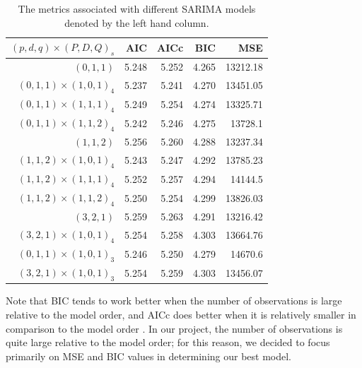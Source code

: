 \documentclass[11pt]{paper}
\begin{document}
\begin{table}
\centering
\begin{tabular}{r || r | r| r| r}
$(p, d, q) \times(P, D, Q)_s$   & AIC   &AICc   &BIC    &MSE\\
\hline
$(0, 1, 1)$               & 5.248 &5.252  &4.265  &13212.18\\
$(0, 1, 1) \times (1, 0, 1)_4$   & 5.237 &5.241  &4.270  &13451.05\\ %
$(0, 1, 1) \times (1, 1, 1)_4$   & 5.249 &5.254  &4.274  &13325.71\\
$(0, 1, 1) \times (1, 1, 2)_4$   & 5.242 &5.246  &4.275  &13728.1\\
\hline
$(1, 1, 2)$               & 5.256 & 5.260 &4.288  &13237.34\\
$(1, 1, 2) \times (1, 0, 1)_4$   & 5.243 &5.247  &4.292  &13785.23\\ %
$(1, 1, 2) \times (1, 1, 1)_4$   & 5.252 & 5.257 &4.294  &14144.5\\
$(1, 1, 2)\times (1, 1, 2)_4$   & 5.250 & 5.254 & 4.299 &13826.03\\
\hline
$(3, 2, 1)$             & 5.259& 5.263& 4.291 & 13216.42\\
$(3, 2, 1) \times (1, 0, 1)_4$ & 5.254& 5.258 & 4.303 &13664.76\\
\hline
$(0, 1, 1) \times (1, 0, 1)_3$ & 5.246 & 5.250 & 4.279 & 14670.6\\
$(3, 2, 1) \times (1, 0, 1)_3$ & 5.254 & 5.259 & 4.303 & 13456.07
\end{tabular}
\caption{The metrics associated with different SARIMA models denoted by the left hand column.}
\label{results}
\end{table}


Note that BIC tends to work better when the number of observations is large relative to the model order, and AICc does better when it is relatively smaller in comparison to the model order \cite{timeseriesanalysis}. In our project, the number of observations is quite large relative to the model order; for this reason, we decided to focus primarily on MSE and BIC values in determining our best model.
\end{document}
